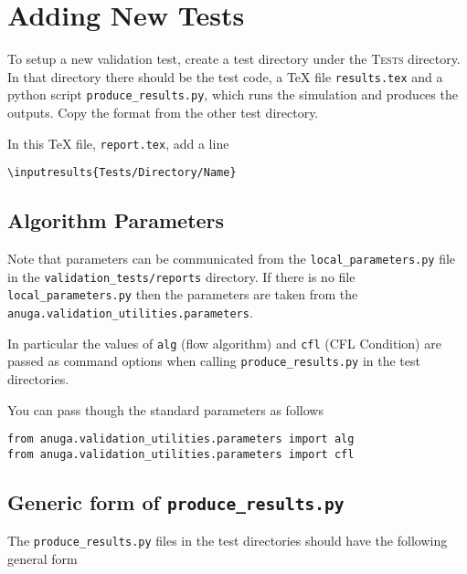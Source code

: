 \documentclass[11pt,a4paper]{report}
\begin{document}


\appendix
\chapter{Adding New Tests}


To setup a new validation test, create a test directory under the
\textsc{Tests} directory. In that directory there should be the test code, a
\TeX{} file \texttt{results.tex} and a python script
\texttt{produce\_results.py}, which runs the simulation and produces the
outputs. Copy the format from the other test directory. 

In this \TeX{} file, \texttt{report.tex}, add a line
\begin{verbatim}
\inputresults{Tests/Directory/Name}
\end{verbatim}



\section{Algorithm Parameters}
Note that parameters can be communicated from the \verb|local_parameters.py|
file in the \verb|validation_tests/reports| directory. If there is no file
\verb|local_parameters.py| then the parameters are taken from the
\verb|anuga.validation_utilities.parameters|. 

In particular the
values of \verb|alg| (flow algorithm) and \verb|cfl| (CFL Condition)
are passed as command options when calling \verb|produce_results.py| in the
test directories.

You can pass though the standard parameters as follows
\begin{verbatim}
from anuga.validation_utilities.parameters import alg
from anuga.validation_utilities.parameters import cfl
\end{verbatim}

\section{Generic form of \texttt{produce\_results.py}}

The \texttt{produce\_results.py} files in the test directories should have the
following general form
\end{document}
